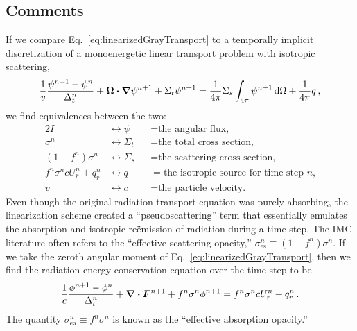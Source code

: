 \subsection{Comments}\label{bgSIComments}
If we compare Eq.~\eqref{eq:linearizedGrayTransport} to a temporally implicit
discretization of a monoenergetic linear transport problem with isotropic
scattering,
\begin{equation*}
  \frac{1}{v} \frac{\psi^{n+1} - \psi^n}{\Delta_t^n} 
  + \bm{\Omega} \bm{\cdot} \bm{\nabla} \psi^{n+1}
 + \Sigma_t \psi^{n+1}
 = \frac{1}{4\pi} \Sigma_s \int_{4\pi} \psi^{n+1}\mathop{}\!\mathrm{d} \Omega
  + \frac{1}{4\pi} q \,,
\end{equation*}
we find equivalences between the two:
\begin{alignat*}{2}
  I &\leftrightarrow \psi &&= \text{the angular flux,}
  \\
  \sigma^n &\leftrightarrow \Sigma_t &&= \text{the total cross section,}
  \\
  \left(1 - f^n\right) \sigma^n &\leftrightarrow \Sigma_s &&= \text{the scattering cross
  section,} 
  \\
  f^n \sigma^n c U_r^n + q_r^n &\leftrightarrow q &&= \text{the isotropic source for time
  step $n$,}
  \\
  v   &\leftrightarrow c &&= \text{the particle velocity.}
\end{alignat*}
Even though the original radiation transport equation was purely
absorbing, the linearization scheme created a ``pseudoscattering''
term that essentially emulates the absorption and isotropic re\"emission of
radiation during a time step. The IMC literature often refers to the
``effective scattering opacity,''
$\sigma_\text{es}^n \equiv \left(1 - f^n\right) \sigma^n$.
If we take the zeroth angular moment of
Eq.~\eqref{eq:linearizedGrayTransport}, then we find the radiation
energy conservation equation over the time step to be
\begin{equation}\label{eq:semiImplicitZeroth}
  \frac{1}{c} \frac{\phi^{n+1} - \phi^n}{\Delta_t^n}
  + \bm{\nabla} \bm{\cdot} \bm{F}^{n+1} + f^n\sigma^n \phi^{n+1}
 =  f^n \sigma^n c U_r^n + q_r^n\,.
\end{equation}
The quantity $\sigma_\text{ea}^n \equiv f^n\sigma^n$ is known as the
``effective absorption opacity.''

